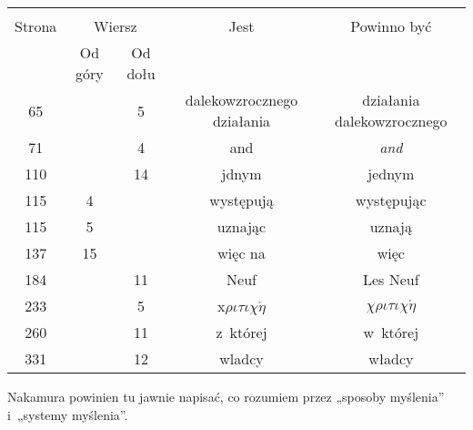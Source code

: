 \documentclass[a4paper,11pt]{article}
\begin{document}
\begin{center}

  \begin{tabular}{|c|c|c|c|c|}
    \hline
    & \multicolumn{2}{c|}{} & & \\
    Strona & \multicolumn{2}{c|}{Wiersz} & Jest
                              & Powinno być \\ \cline{2-3}
    & Od góry & Od dołu & & \\
    \hline
    65  & &  5 & dalekowzrocznego działania & działania dalekowzrocznego \\
    71  & &  4 & and & \textit{and} \\
    110 & & 14 & jdnym & jednym \\
    115 &  4 & & występują & występując \\
    115 &  5 & & uznając & uznają \\
    137 & 15 & & więc na & więc \\
    184 & & 11 & Neuf & Les Neuf \\
    233 & &  5 & x$\rho\iota\tau\iota\chi\acute{\eta}$ & $\chi\rho\iota\tau\iota\chi\acute{\eta}$ \\
    260 & & 11 & z~której & w~której \\
    331 & & 12 & wladcy & władcy \\
    \hline
  \end{tabular}

\end{center}

\vspace{\spaceTwo}

















\start {} Nakamura powinien tu jawnie napisać, co rozumiem przez
„sposoby myślenia” i~„systemy myślenia”.

\vspace{\spaceFour}
\end{document}
